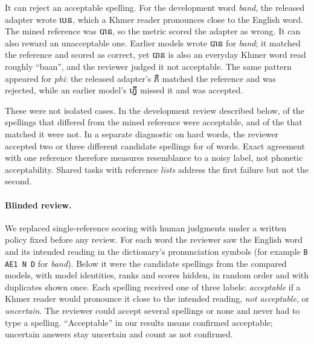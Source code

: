 \documentclass[10pt,a4paper,twocolumn]{article}
\newcommand{\km}[1]{{\khmerfont #1}}
\begin{document}
It can reject an acceptable spelling. For the development word \emph{band}, the released adapter wrote \km{បេន},
which a Khmer reader pronounces close to the English word. The mined reference was \km{បាន}, so the metric scored
the adapter as wrong. It can also reward an unacceptable one. Earlier models wrote \km{បាន} for \emph{band}; it
matched the reference and scored as correct, yet \km{បាន} is also an everyday Khmer word read roughly ``baan'', and
the reviewer judged it not acceptable. The same pattern appeared for \emph{phi}: the released adapter's \km{ភី}
matched the reference and was rejected, while an earlier model's \km{ហ្វី} missed it and was accepted.

These were not isolated cases. In the development review described below,  of the 
spellings that differed from the mined reference were acceptable, and  of the  that
matched it were not. In a separate diagnostic on hard words, the reviewer accepted two or three different candidate
spellings for  of  words. Exact agreement with one reference therefore measures resemblance to a
noisy label, not phonetic acceptability. Shared tasks with reference \emph{lists} \citep{chen-etal-2018-news}
address the first failure but not the second.

\paragraph{Blinded review.}
We replaced single-reference scoring with human judgments under a written policy fixed before any review. For each
word the reviewer saw the English word and its intended reading in the dictionary's pronunciation symbols (for
example \texttt{B AE1 N D} for \emph{band}). Below it were the candidate spellings from the compared models, with model identities,
ranks and scores hidden, in random order and with duplicates shown once. Each spelling received one of three
labels: \emph{acceptable} if a Khmer reader would pronounce it close to the intended reading, \emph{not
acceptable}, or \emph{uncertain}. The reviewer could accept several spellings or none and never had to type a
spelling. ``Acceptable'' in our results means confirmed acceptable; uncertain answers stay uncertain and count as
not confirmed.
\end{document}

